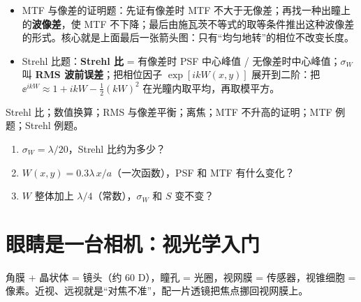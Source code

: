 \pkao
\begin{itemize}
\item MTF 与像差的证明题：先证有像差时 MTF 不大于无像差；再找一种出瞳上的\textbf{波像差}，使 MTF 不下降；最后由施瓦茨不等式的取等条件推出这种波像差的形式。核心就是上面最后一张箭头图：只有“均匀地转”的相位不改变长度。
\item Strehl 比题：\textbf{Strehl 比} = 有像差时 PSF 中心峰值 / 无像差时中心峰值；$\sigma_W$ 叫 \textbf{RMS 波前误差}；把相位因子 $\exp[ikW(x,y)]$ 展开到二阶：把 $\ee^{ikW}\approx1+ikW-\frac12(kW)^2$ 在光瞳内取平均，再取模平方。
\end{itemize}

\psee Strehl 比\pageref{sec:strehl}；数值换算\pageref{sec:strehl-num}；RMS 与像差平衡\pageref{sec:aberrms}；离焦\pageref{sec:defocus-units}；MTF 不升高的证明\pageref{sec:mtfproof}；MTF 例题\pageref{ex:v-mtf}；Strehl 例题\pageref{ex:v-strehl}。

\begin{enumerate}[label=\arabic*.]
\item $\sigma_W=\lambda/20$，Strehl 比约为多少？
\item $W(x,y)=0.3\lambda\,x/a$（一次函数），PSF 和 MTF 有什么变化？
\item $W$ 整体加上 $\lambda/4$（常数），$\sigma_W$ 和 $S$ 变不变？
\end{enumerate}

\section{眼睛是一台相机：视光学入门}\label{sec:p-eye}

\begin{idea}[一句话]
角膜 + 晶状体 = 镜头（约 60 D），瞳孔 = 光圈，视网膜 = 传感器，视锥细胞 = 像素。近视、远视就是“对焦不准”，配一片透镜把焦点挪回视网膜上。
\end{idea}

